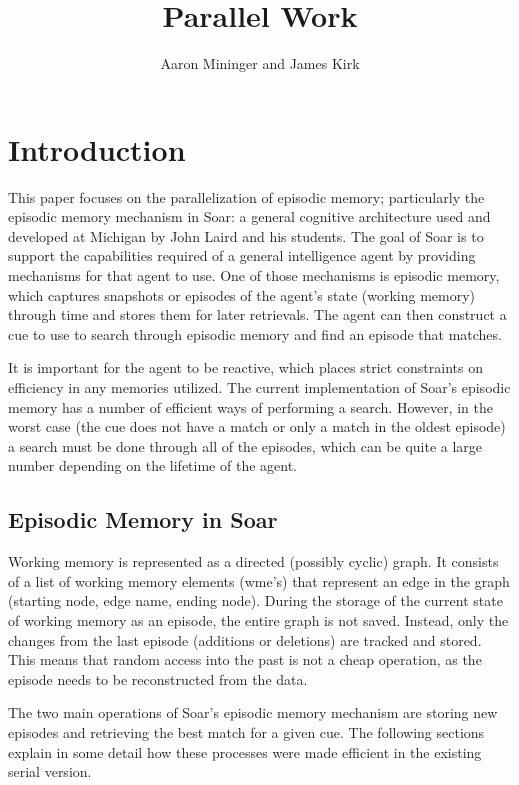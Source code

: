 \documentclass[11pt]{article} %
\title{Parallel Work}
\author{Aaron Mininger and James Kirk}
\begin{document}
\maketitle

\section{Introduction}
This paper focuses on the parallelization of episodic memory; particularly the
episodic memory mechanism in Soar: a general cognitive architecture used and
developed at Michigan by John Laird and his students. The goal of Soar is to
support the capabilities required of a general intelligence agent by providing
mechanisms for that agent to use. One of those mechanisms is episodic memory,
which captures snapshots or episodes of the agent’s state (working memory)
through time and stores them for later retrievals. The agent can then construct
a cue to use to search through episodic memory and find an episode that matches.

It is important for the agent to be reactive, which places strict constraints on
efficiency in any memories utilized. The current implementation of Soar’s
episodic memory has a number of efficient ways of performing a search. However,
in the worst case (the cue does not have a match or only a match in the oldest
episode) a search must be done through all of the episodes, which can be quite a
large number depending on the lifetime of the agent.

\subsection{Episodic Memory in Soar}
Working memory is represented as a directed (possibly cyclic) graph. It consists
of a list of working memory elements (wme’s) that represent an edge in the graph
(starting node, edge name, ending node). During the storage of the current state
of working memory as an episode, the entire graph is not saved. Instead, only
the changes from the last episode (additions or deletions) are tracked and
stored. This means that random access into the past is not a cheap operation, as
the episode needs to be reconstructed from the data.

The two main operations of Soar’s episodic memory mechanism are storing new
episodes and retrieving the best match for a given cue. The following sections
explain in some detail how these processes were made efficient in the existing
serial version.
\end{document}
